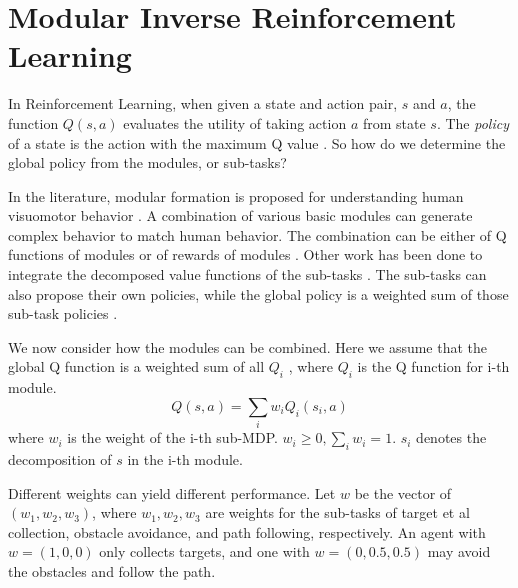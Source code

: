 \section{Modular Inverse Reinforcement Learning}
\label{sec:rl}

In Reinforcement Learning, when given a state and action pair, $s$ and $a$, the
function $Q(s, a)$ evaluates the utility of taking action $a$ from state $s$.
The {\em policy} of a state is the action with the maximum Q value \cite{rl}. So
how do we determine the global policy from the modules, or sub-tasks?

In the literature, modular formation is proposed for understanding human
visuomotor behavior \cite{sprague2007modeling}. A combination of various basic
modules can generate complex behavior to match human behavior.  The combination
can be either of Q functions of modules \cite{rothkopf2013modular} or of rewards
of modules \cite{Rothkopf12Infer}.
Other work has been done to integrate the decomposed value functions of
the sub-tasks \cite{koller1999computing}. The sub-tasks can also propose their
own policies, while the global policy is a weighted sum of those sub-task
policies \cite{thomas2012motor}.

We now consider how the
modules can be combined. Here we assume that the global Q function is a weighted
sum of all $Q_i$ \cite{sprague2007modeling, rothkopf2013modular}, where $Q_i$ is
the Q function for i-th module.
$$Q(s, a) = \sum_i w_i Q_i (s_i, a)$$
where $w_i$ is the weight of the i-th sub-MDP. $w_i \geq 0, \sum_i w_i = 1$.
$s_i$ denotes the decomposition of $s$ in the i-th module.

Different weights can yield different performance. Let $w$ be the vector of
$(w_1, w_2, w_3)$, where $w_1, w_2, w_3$ are weights for the sub-tasks of target et al 
collection, obstacle avoidance, and path following, respectively. An agent with
$w = (1, 0, 0)$ only collects targets, and one with $w = (0, 0.5, 0.5)$ may
avoid the obstacles and follow the path.


